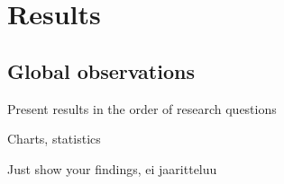 \section{Results}
\justify

\subsection{Global observations}
\justify
Present results in the order of research questions \par
Charts, statistics \par
Just show your findings, ei jaaritteluu \par